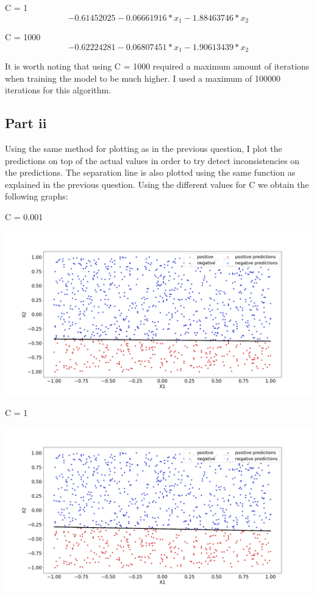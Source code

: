 \documentclass[10pt]{article}
\begin{document}
C = 1
\begin{equation*}
    -0.61452025 - 0.06661916 * x_{1} - 1.88463746 * x_{2}
\end{equation*}

C = 1000
\begin{equation*}
    -0.62224281 - 0.06807451 * x_{1} - 1.90613439 * x_{2}
\end{equation*}



It is worth noting that using C = 1000 required a maximum amount of iterations
when training the model to be much higher. I used a maximum of 100000 iterations
for this algorithm.

\subsection*{Part ii}
Using the same method for plotting as in the previous question,
I plot the predictions on top of the actual values in order to try
detect inconsistencies on the predictions. The separation
line is also plotted using the same function as explained
in the previous question. Using the different values for C we
obtain the following graphs:

C = 0.001

\includegraphics[scale=0.245]{Figure_C_0001.png}

C = 1

\includegraphics[scale=0.245]{Figure_C_1.png}
\end{document}
